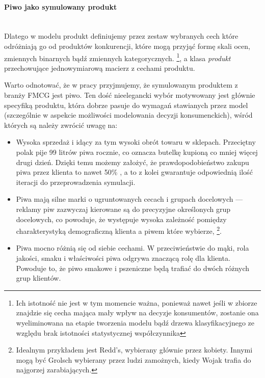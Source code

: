 \documentclass[polish, twoside, 12pt, a4paper]{article}
\theoremstyle{definition}
\theoremstyle{plain}
\theoremstyle{remark}
\begin{document}
\paragraph{Piwo jako symulowany produkt}\mbox{}\\

Dlatego w modelu produkt definiujemy przez zestaw wybranych cech które odróżniają go od produktów konkurencji, które mogą przyjąć formę skali ocen, zmiennych binarnych bądź zmiennych kategorycznych. \footnote{Ich istotność nie jest w tym momencie ważna, ponieważ nawet jeśli w zbiorze znajdzie się cecha mająca mały wpływ na decyzje konsumentów, zostanie ona wyeliminowana na etapie tworzenia modelu bądź drzewa klasyfikacyjnego ze względu brak istotności statystycznej współczynnika}, a klasa \textit{produkt} przechowujące jednowymiarową macierz z cechami produktu.

Warto odnotować, że w pracy przyjmujemy, że symulowanym produktem z branży FMCG jest piwo. Ten dość nieelegancki wybór motywowany jest głównie specyfiką produktu, która dobrze pasuje do wymagań stawianych przez model (szczególnie w aspekcie możliwości modelowania decyzji konsumenckich), wśród których są należy zwrócić uwagę na:

	\begin{itemize}
			\item Wysoka sprzedaż i idący za tym wysoki obrót towaru w sklepach. Przeciętny polak pije 99 litrów piwa rocznie, co oznacza butelkę kupioną co mniej więcej drugi dzień. Dzięki temu możemy założyć, że prawdopodobieństwo zakupu piwa przez klienta to nawet 50\% , a to z kolei gwarantuje odpowiednią ilość iteracji do przeprowadzenia symulacji. 
			\item Piwa mają silne marki o ugruntowanych cecach i grupach docelowych --- reklamy piw zazwyczaj kierowane są do precyzyjne określonych grup docelowych, co powoduje, że występuje wysoka zależność pomiędzy charakterystyką demograficzną klienta a piwem które wybierze, \footnote{Idealnym przykładem jest Redd's, wybierany głównie przez kobiety. Innymi mogą być Grolsch wybierany przez ludzi zamożnych, kiedy Wojak trafia do najgorzej zarabiających.}. 
			\item Piwa mocno różnią się od siebie cechami. W przeciwieństwie do mąki, rola jakości, smaku i właściwości piwa odgrywa znaczącą rolę dla klienta. Powoduje to, że piwo smakowe i pszeniczne będą trafiać do dwóch różnych grup klientów.
	\end{itemize}
\end{document}
